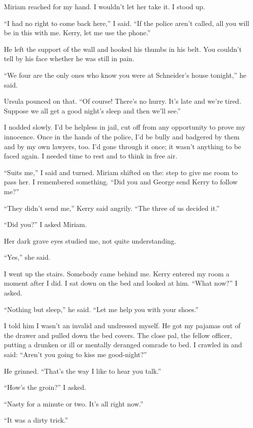 \documentclass{novel}
\begin{document}
Miriam reached for my hand. I wouldn’t let her take it. I stood up.

“I had no right to come back here,” I said. “If the police aren’t called, all you will be in this with me. Kerry, let me use the phone.”

He left the support of the wall and hooked his thumbs in his belt. You couldn’t tell by his face whether he was still in pain. 

“We four are the only ones who know you were at Schneider’s house tonight,” he said.

Ursula pounced on that. “Of course! There’s no hurry. It’s late and we’re tired. Suppose we all get a good night’s sleep and then we’ll see.”

\scenestars

I nodded slowly. I’d be helpless in jail, cut off from any opportunity to prove my innocence. Once in the hands of the police, I’d be bully and badgered by them and by my own lawyers, too. I’d gone through it once; it wasn’t anything to be faced again. I needed time to rest and to think in free air.

“Suits me,” I said and turned. Miriam shifted on the: step to give me room to pass her. I remembered something. “Did you and George send Kerry to follow me?”

“They didn’t send me,” Kerry said angrily. “The three of us decided it.”

“Did you?” I asked Miriam.

Her dark grave eyes studied me, not quite understanding.

“Yes,” she said.

I went up the stairs. Somebody came behind me. Kerry entered my room a moment after I did. I sat down on the bed and looked at him. “What now?” I asked.

“Nothing but sleep,” he said. “Let me help you with your shoes.”

I told him I wasn’t an invalid and undressed myself. He got my pajamas out of the drawer and pulled down the bed covers. The close pal, the fellow officer, putting a drunken or ill or mentally deranged comrade to bed. I crawled in and said: “Aren’t you going to kiss me good-night?”

He grinned. “That’s the way I like to hear you talk.”

“How’s the groin?” I asked.

“Nasty for a minute or two. It’s all right now.”

“It was a dirty trick.”
\end{document}
